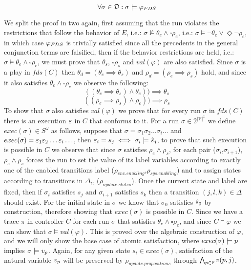 \[\forall \sigma \in \mathcal{D}: \sigma \models \varphi_{FDS} \]

We split the proof in two again, first assuming that the run violates the restrictions that follow the behavior of $E$, i.e.: $\sigma \not\models \theta_e \wedge \square \rho_e$, i.e.: $\sigma \models \neg\theta_e \vee \Diamond \neg\rho_e$, in which case $\varphi_{FDS}$ is trivially satisfied since all the precedents in the general conjunction terms are falsified, then if the behavior restrictions are held, i.e.: $\sigma \models \theta_e \wedge \square \rho_e$, we must prove that $\theta_s$, $\square\rho_s$ and $val(\varphi)$ are also satisfied. Since $\sigma$ is a play in $fds(C)$ then $\theta_d=(\theta_e \implies \theta_s)$ and $\rho_d=(\rho_e \implies \rho_s)$ hold, and since it also satisfies $\theta_e \wedge \square \rho_e$ we observe the following:
\[((\theta_e \implies \theta_s) \wedge \theta_e))\implies \theta_s\]
\[((\rho_e \implies \rho_s) \wedge \rho_e))\implies \rho_s\]
To show that $\sigma$ also satisfies $val(\varphi)$ we prove that for every run $\sigma$ in $fds(C)$ there is an execution $\varepsilon$ in $C$ that conforms to it.
For a run $\sigma \in 2^{|\mathcal{V}|^{\omega}}$ we define $exec(\sigma) \in S^{\omega}$ as follows, suppose that $\sigma = \sigma_1 \sigma_2 \ldots \sigma_i \ldots$ and
$exec(\sigma)= \varepsilon_1 \varepsilon_2 \ldots \varepsilon_i \ldots$, then $\varepsilon_i = s_j \iff \sigma_i \models \hat{s}_{j}$, to prove that such execution is possible in $C$ we observe that since $\sigma$ satisfies $\rho_e \wedge \rho_s$, for each pair ($\sigma_i$,$\sigma_{i+1}$),  $\rho_e \wedge \rho_s$ forces
the run to set the value of its label variables according to exactly one of the enabled transitions label ($\rho_{env.enabling}$,$\rho_{sys.enabling}$) and to assign states according to transitions in $\Delta_C$ ($\rho_{update.states}$). Once the current state and label are fixed, then if $\sigma_i$ satisfies $s_j$ and $\sigma_{i+1}$ satisfies $s_k$ then a transition $(j, l, k) \in \Delta$ should exist. For the initial state in $\sigma$ we know that $\sigma_0$ satisfies $\hat{s}_{0}$ by construction, therefore showing that $exec(\sigma)$ is possible in $C$.
Since we have a trace $\pi$ in controller $C$ for each run $\sigma$ that satisfies $\theta_e \wedge \square \rho_e$, and since $C \models \varphi$ we can show that $\sigma \models val(\varphi)$. This is proved over the algebraic construction of $\varphi$, and we will only show the base case of atomic satisfaction, where
$exec(\sigma) \models p$ implies $\sigma \models v_{p}$. Again, for any given state $s_i \in exec(\sigma)$, satisfaction of the natural variable $v_{p}$ will be preserved by  $\rho_{update.propositions}$ through $\bigwedge_{p \in \mathbb{P}}v(p,j)$.\\
\\

